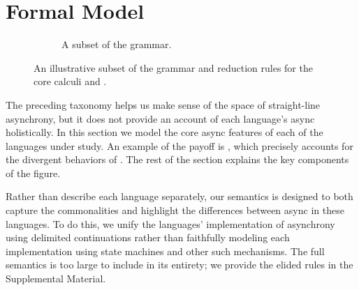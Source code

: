 \section{Formal Model}\label{sec:semantics}

\begin{figure}[t]
  \begin{subfigure}[t]{0.4\textwidth}
    \vspace{0cm}
    
    \cprotect\caption{A subset of the \lc grammar.
    \label{fig:lang:lc}}
  \end{subfigure}\hfill%
  \begin{minipage}[t]{0.55\textwidth}
    \vspace{0pt}
    \begin{subfigure}{\textwidth}
      \vspace{0cm}
      
      \cprotect{}
      \label{fig:lang:exn}
    \end{subfigure}
    \begin{subfigure}{\textwidth}
      \vspace{1em}
      
      \cprotect{}
      \label{fig:lang:exn:red}
    \end{subfigure}
  \end{minipage}
  \caption{An illustrative subset of the grammar and reduction rules for the core calculi \lc and \exn.}
  \label{fig:lang:core}
\end{figure}

The preceding taxonomy helps us make sense of the space of straight-line asynchrony, but it does not provide an account of each language's async holistically. In this section we model the core async features of each of the languages under study. An example of the payoff is , which precisely accounts for the divergent behaviors of . The rest of the section explains the key components of the figure.

Rather than describe each language separately, our semantics is designed to both capture the commonalities and highlight the differences between async in these languages. To do this, we unify the languages' implementation of asynchrony using delimited continuations rather than faithfully modeling each implementation using state machines and other such mechanisms. The full semantics is too large to include in its entirety; we provide the elided rules in the Supplemental Material.

